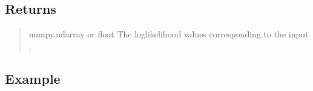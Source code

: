 \documentclass[a4paper,11pt,openany,english]{sphinxmanual}
\begin{document}
\begin{fulllineitems}
\begin{quote}
\begin{description}
\end{description}\end{quote}


\subsection{Returns}
\label{\detokenize{api_misc:id19}}\begin{quote}\begin{description}
\sphinxAtStartPar
numpy.ndarray or float
The log\sphinxhyphen{}likelihood values corresponding to the input .

\end{description}\end{quote}


\subsection{Example}
\label{\detokenize{api_misc:id20}}
\begin{sphinxVerbatim}[commandchars=\\\{\}]
   
  \PYG{p}{[}    \PYG{p}{]}
   
\end{sphinxVerbatim}

\end{fulllineitems}
\end{document}
